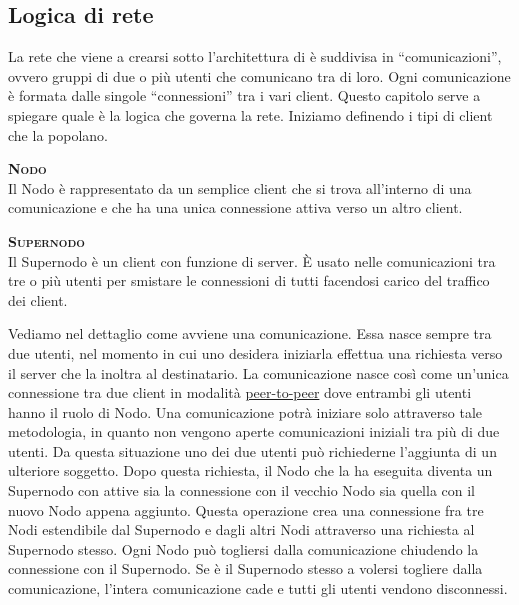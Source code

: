 \subsection{Logica di rete}
La rete che viene a crearsi sotto l'architettura di \caName{} è suddivisa in ``comunicazioni'', ovvero gruppi di due o più utenti che comunicano tra di loro. Ogni comunicazione è formata dalle singole ``connessioni'' tra i vari client.
Questo capitolo serve a spiegare quale è la logica che governa la rete. Iniziamo definendo i tipi di client che la popolano.
\begin{description}
	\item{\scshape\bfseries Nodo}\\
	Il Nodo è rappresentato da un semplice client che si trova all'interno di una comunicazione e che ha una unica connessione attiva verso un altro client.
	\item{\scshape\bfseries Supernodo}\\
	Il Supernodo è un client con funzione di server. È usato nelle comunicazioni tra tre o più utenti per smistare le connessioni di tutti facendosi carico del traffico dei client.
\end{description}
Vediamo nel dettaglio come avviene una comunicazione. Essa nasce sempre tra due utenti, nel momento in cui uno desidera iniziarla effettua una richiesta verso il server che la inoltra al destinatario.
La comunicazione nasce così come un'unica connessione tra due client in modalità \underline{peer-to-peer} dove entrambi gli utenti hanno il ruolo di Nodo. Una comunicazione potrà iniziare solo attraverso tale metodologia, in quanto non vengono aperte comunicazioni iniziali tra più di due utenti.
Da questa situazione uno dei due utenti può richiederne l'aggiunta di un ulteriore soggetto. Dopo questa richiesta, il Nodo che la ha eseguita diventa un Supernodo con attive sia la connessione con il vecchio Nodo sia quella con il nuovo Nodo appena aggiunto.
Questa operazione crea una connessione fra tre Nodi estendibile dal Supernodo e dagli altri Nodi attraverso una richiesta al Supernodo stesso. 
Ogni Nodo può togliersi dalla comunicazione chiudendo la connessione con il Supernodo. Se è il Supernodo stesso a volersi togliere dalla comunicazione, l'intera comunicazione cade e tutti gli utenti vendono disconnessi.
